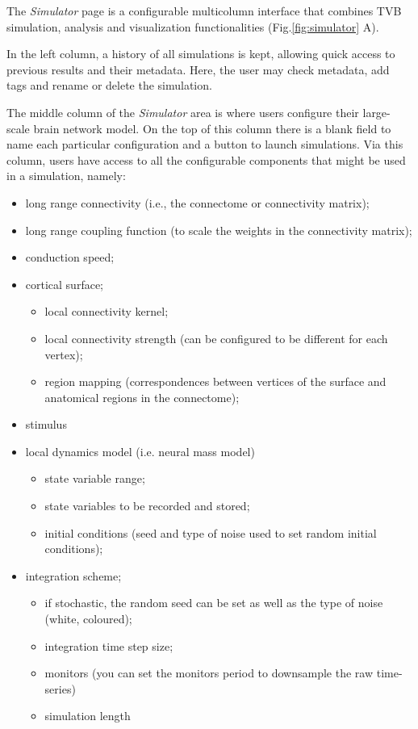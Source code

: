 \documentclass{bioinfo}
\begin{document}
		The \emph{Simulator} page is a configurable multicolumn interface 
        that combines TVB simulation, analysis and visualization functionalities (Fig.\ref{fig:simulator} A).

		In the left column, a history of all simulations is kept, allowing
        quick access to previous results and their metadata. Here, the user
        may check metadata, add tags and rename or delete the simulation.

		The middle column of the \emph{Simulator} area is where users configure their
		large-scale brain network model. On the top of this column there is a blank
		field to name each particular configuration and a button to launch simulations.
		Via this column, users have access to all the configurable components that might
		be used in a simulation, namely:

		{\small

		\begin{itemize}
			\item long range connectivity (i.e., the connectome or connectivity matrix);
			\item long range coupling function (to scale the weights in the connectivity matrix);
			\item conduction speed;
			\item cortical surface;
			\begin{itemize}
				\item local connectivity kernel;
				\item local connectivity strength (can be configured to be different for each vertex);
				\item region mapping (correspondences between vertices of the surface and anatomical regions in the connectome);
			\end{itemize}
			\item stimulus
			\item local dynamics model (i.e. neural mass model)
				\begin{itemize}
					\item state variable range;
					\item state variables to be recorded and stored;
					\item initial conditions (seed and type of noise used to set random initial conditions);
				\end{itemize}
			\item integration scheme;
			\begin{itemize}
				\item if stochastic, the random seed can be set as well as the type of noise (white, coloured);
				\item integration time step size;
			\item monitors (you can set the monitors period to downsample the raw time-series)
			\item simulation length
			\end{itemize}
		\end{itemize}
		}
\end{document}
